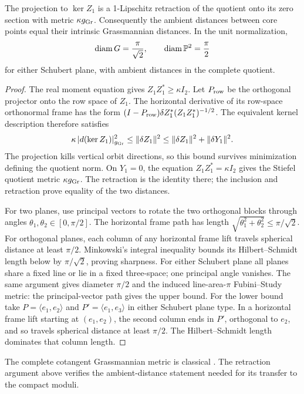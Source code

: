 \begin{lemma}\label{lem:grass-retraction}
The projection to \(\ker Z_1\) is a 1-Lipschitz retraction of the
quotient onto its zero section with metric \(\kappa g_{\operatorname{Gr}}\).
Consequently the ambient distances between core points equal
their intrinsic Grassmannian distances. In the unit normalization,
\[
 \operatorname{diam} G=\frac{\pi}{\sqrt2},\qquad
 \operatorname{diam} \mathbb P^2=\frac{\pi}{2}
\]
for either Schubert plane, with ambient distances in the
complete quotient.
\end{lemma}

\begin{proof}
The real moment equation gives \(Z_1Z_1^*\ge\kappa I_2\).
Let \(P_{\rm row}\) be the orthogonal projector onto the row
space of \(Z_1\).
The horizontal derivative of its row-space orthonormal frame
has the form
\((I-P_{\rm row})\delta Z_1^*(Z_1Z_1^*)^{-1/2}\).
The equivalent kernel description therefore satisfies
\[
 \kappa\,|d(\ker Z_1)|_{g_{\operatorname{Gr}}}^2
       \le\|\delta Z_1\|^2
       \le\|\delta Z_1\|^2+\|\delta Y_1\|^2.
\]
The projection kills vertical orbit directions, so this bound
survives minimization defining the quotient norm.
On \(Y_1=0\), the equation \(Z_1Z_1^*=\kappa I_2\) gives
the Stiefel quotient metric \(\kappa g_{\operatorname{Gr}}\).
The retraction is the identity there; the inclusion and
retraction prove equality of the two distances.

For two planes, use principal vectors to rotate the two
orthogonal blocks through angles
\(\theta_1,\theta_2\in[0,\pi/2]\).
The horizontal frame path has length
\(\sqrt{\theta_1^2+\theta_2^2}\le\pi/\sqrt2\).
For orthogonal planes, each column of any horizontal frame
lift travels spherical distance at least \(\pi/2\).
Minkowski's integral inequality bounds its Hilbert--Schmidt
length below by \(\pi/\sqrt2\), proving sharpness.
For either Schubert plane all planes share a fixed line or
lie in a fixed three-space; one principal angle vanishes.
The same argument gives diameter \(\pi/2\) and the induced
line-area-\(\pi\) Fubini--Study metric: the principal-vector
path gives the upper bound. For the lower bound take
\(P=\langle e_1,e_2\rangle\) and
\(P'=\langle e_1,e_3\rangle\) in either Schubert plane type.
In a horizontal frame lift starting at \((e_1,e_2)\), the second
column ends in \(P'\), orthogonal to \(e_2\), and so travels
spherical distance at least \(\pi/2\). The Hilbert--Schmidt
length dominates that column length.
\end{proof}

The complete cotangent Grassmannian metric is classical
\cite[Theorem~1 and Section~2.2]{biquardgauduchon}.
The retraction argument above verifies the ambient-distance
statement needed for its transfer to the compact moduli.

